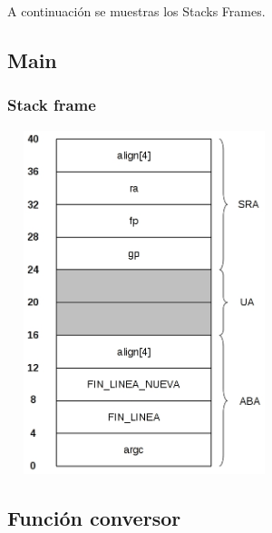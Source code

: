 \documentclass[a4paper,10pt]{article}
\begin{document}
  A continuaci\'on se muestras los Stacks Frames.

  \subsection{Main}
    \subsubsection{Stack frame}
      \begin{center}
	\includegraphics[width=8cm, height=10cm]{DibujosStackFrame/stack-main.jpg}
      \end{center}

  \subsection{Funci\'on conversor}
\end{document}
